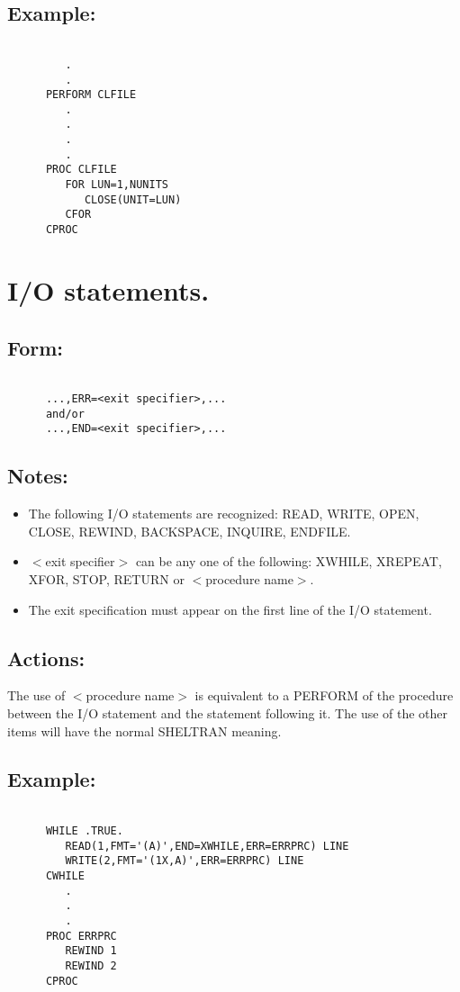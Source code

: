 \subsection{Example:}
\begin{verbatim}

         . 
         . 
      PERFORM CLFILE
         . 
         . 
         . 
         .
      PROC CLFILE 
         FOR LUN=1,NUNITS
            CLOSE(UNIT=LUN) 
         CFOR
      CPROC 

\end{verbatim}
\section{I/O statements.}
\subsection{Form:}
\begin{verbatim}

      ...,ERR=<exit specifier>,... 
      and/or 
      ...,END=<exit specifier>,... 

\end{verbatim}
\subsection{Notes:}
\begin{itemize}

\item The following I/O statements are recognized: READ, WRITE, OPEN,
CLOSE, REWIND, BACKSPACE, INQUIRE, ENDFILE. 

\item $<$exit specifier$>$ can be any one of the following: XWHILE,
XREPEAT, XFOR, STOP, RETURN or $<$procedure name$>$. 

\item The exit specification must appear on the first line of the I/O
statement. 

\end{itemize}
\subsection{Actions:}

The use of $<$procedure name$>$ is equivalent to a PERFORM of the
procedure between the I/O statement and the statement following it.  The
use of the other items will have the normal SHELTRAN meaning. 

\subsection{Example:}
\begin{verbatim}

      WHILE .TRUE.
         READ(1,FMT='(A)',END=XWHILE,ERR=ERRPRC) LINE
         WRITE(2,FMT='(1X,A)',ERR=ERRPRC) LINE 
      CWHILE
         .
         .
         .
      PROC ERRPRC 
         REWIND 1
         REWIND 2
      CPROC 

\end{verbatim}
